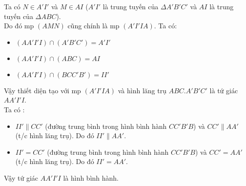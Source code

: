 \begin{ex}
{		
		Ta có $ N \in A'I'$ và $ M \in AI $ ($ A'I' $ là trung tuyến của $ \Delta A'B'C' $ và $ AI$ là trung tuyến của $ \Delta ABC $).\\
		Do đó mp $ (AMN) $ cũng chính là mp $ (A'I'IA) $.
		Ta có:
		\begin{itemize}
			\item $ (AA'I'I) \cap (A'B'C') = A'I'$
			\item $ (AA'I'I) \cap (ABC) = AI$
			\item $ (AA'I'I) \cap (BCC'B') = II'$
		\end{itemize}
		Vậy thiết diện tạo với  mp $ (A'I'IA) $ và hình lăng trụ $ ABC.A'B'C' $ là tứ giác $ AA'I'I $.\\
		Ta có :
		\begin{itemize}
			\item $ II' \parallel CC' $ (đường trung bình trong hình bình hành $ CC'B'B $)  và $ CC' \parallel AA' $ (t/c hình lăng trụ).  Do đó $ II' \parallel AA' $.
			\item $ II' = CC' $ (đường trung bình trong hình bình hành $ CC'B'B $)  và $ CC' =AA' $ (t/c hình lăng trụ).  Do đó $ II' = AA' $.
			
		\end{itemize}
		Vậy tứ giác $ AA'I'I $ là hình bình hành.
	}
\end{ex}
